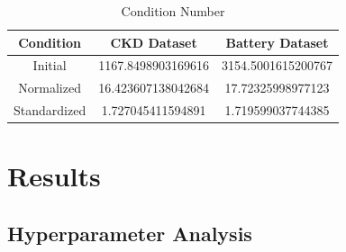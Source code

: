 \documentclass{article}
\begin{document}
\begin{table}[ht]
  \centering
  \caption{Condition Number}
  \begin{tabular}{|c|c|c|}
  \hline
  \textbf{Condition} & \textbf{CKD Dataset} & \textbf{Battery Dataset} \\
  \hline
  Initial      & 1167.8498903169616 & 3154.5001615200767 \\
  Normalized   & 16.423607138042684 & 17.72325998977123 \\
  Standardized & 1.727045411594891  & 1.719599037744385  \\
  \hline
  \end{tabular}
  \end{table}

\section{Results}
\subsection{Hyperparameter Analysis}
\end{document}
